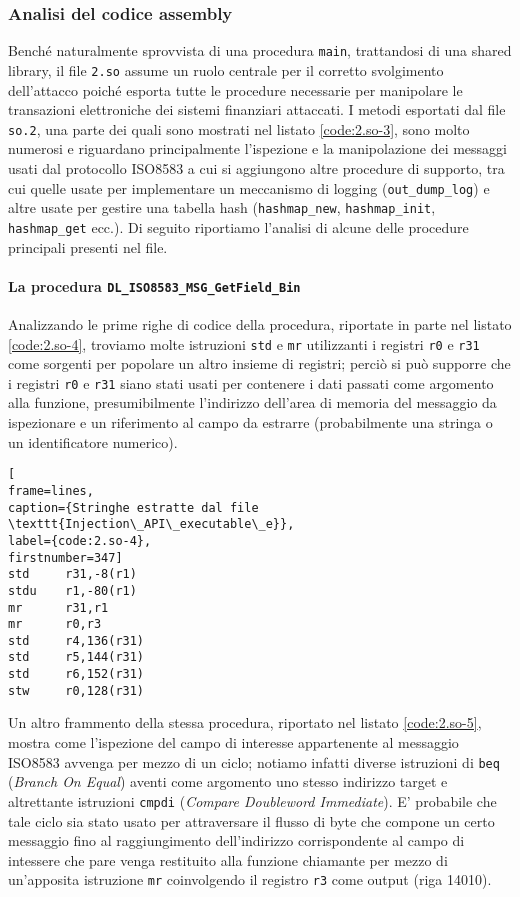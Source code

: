 \documentclass[10pt,a4paper, titlepage]{report}
\begin{document}
\subsubsection{Analisi del codice assembly}

Benché naturalmente sprovvista di una procedura \texttt{main}, trattandosi di una shared library, il file \texttt{2.so} assume un ruolo centrale per il corretto svolgimento dell'attacco poiché esporta tutte le procedure necessarie per manipolare le transazioni elettroniche dei sistemi finanziari attaccati.
I metodi esportati dal file \texttt{so.2}, una parte dei quali sono mostrati nel listato \ref{code:2.so-3}, sono molto numerosi e riguardano principalmente l'ispezione e la manipolazione dei messaggi usati dal protocollo ISO8583 a cui si aggiungono altre procedure di supporto, tra cui quelle usate per implementare un meccanismo di logging (\texttt{out\_dump\_log}) e altre usate per gestire una tabella hash (\texttt{hashmap\_new}, \texttt{hashmap\_init}, \texttt{hashmap\_get} ecc.).
Di seguito riportiamo l'analisi di alcune delle procedure principali presenti nel file.

\paragraph{La procedura \texttt{DL\_ISO8583\_MSG\_GetField\_Bin}} 

Analizzando le prime righe di codice della procedura, riportate in parte nel listato \ref{code:2.so-4}, troviamo molte istruzioni \texttt{std} e \texttt{mr} utilizzanti i registri \texttt{r0} e \texttt{r31} come sorgenti per popolare un altro insieme di registri; perciò si può supporre che i registri \texttt{r0} e \texttt{r31} siano stati usati per contenere i dati passati come argomento alla funzione, presumibilmente l'indirizzo dell'area di memoria del messaggio da ispezionare e un riferimento al campo da estrarre (probabilmente una stringa o un identificatore numerico).

\begin{lstlisting}[
frame=lines, 
caption={Stringhe estratte dal file \texttt{Injection\_API\_executable\_e}}, 
label={code:2.so-4},
firstnumber=347]
std     r31,-8(r1)
stdu    r1,-80(r1)
mr      r31,r1
mr      r0,r3
std     r4,136(r31)
std     r5,144(r31)
std     r6,152(r31)
stw     r0,128(r31)
\end{lstlisting}

Un altro frammento della stessa procedura, riportato nel listato \ref{code:2.so-5}, mostra come l'ispezione del campo di interesse appartenente al messaggio ISO8583 avvenga per mezzo di un ciclo; notiamo infatti diverse istruzioni di \texttt{beq} (\textit{Branch On Equal}) aventi come argomento uno stesso indirizzo target e altrettante istruzioni \texttt{cmpdi} (\textit{Compare Doubleword Immediate}). 
E' probabile che tale ciclo sia stato usato per attraversare il flusso di byte che compone un certo messaggio fino al raggiungimento dell'indirizzo corrispondente al campo di intessere che pare venga restituito alla funzione chiamante per mezzo di un'apposita istruzione \texttt{mr} coinvolgendo il registro \texttt{r3} come output (riga 14010).
\end{document}
